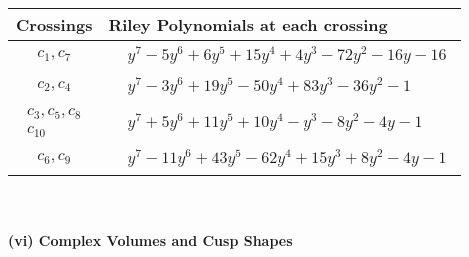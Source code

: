 \documentclass[1p]{elsarticle_modified}
\theoremstyle{definition}
\begin{document}
\begin{tabular}{m{50pt}|m{274pt}}
Crossings & \hspace{64pt}Riley Polynomials at each crossing \\
\hline $$\begin{aligned}c_{1},c_{7}\end{aligned}$$&$\begin{aligned}
&y^7-5 y^6+6 y^5+15 y^4+4 y^3-72 y^2-16 y-16
\end{aligned}$\\
\hline $$\begin{aligned}c_{2},c_{4}\end{aligned}$$&$\begin{aligned}
&y^7-3 y^6+19 y^5-50 y^4+83 y^3-36 y^2-1
\end{aligned}$\\
\hline $$\begin{aligned}c_{3},c_{5},c_{8}\\c_{10}\end{aligned}$$&$\begin{aligned}
&y^7+5 y^6+11 y^5+10 y^4- y^3-8 y^2-4 y-1
\end{aligned}$\\
\hline $$\begin{aligned}c_{6},c_{9}\end{aligned}$$&$\begin{aligned}
&y^7-11 y^6+43 y^5-62 y^4+15 y^3+8 y^2-4 y-1
\end{aligned}$\\
\hline
\end{tabular}\\~\\
\newpage\flushleft \textbf{(vi) Complex Volumes and Cusp Shapes}
\end{document}
